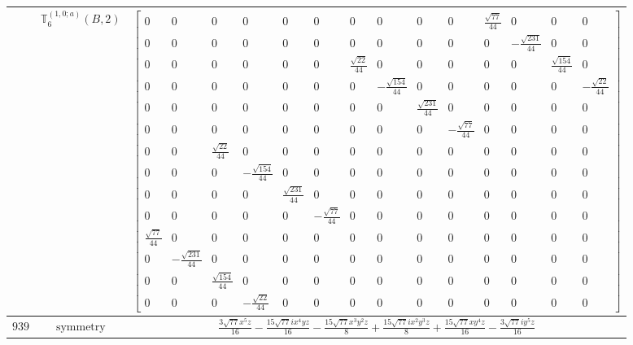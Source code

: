 \documentclass[fleqn,8pt,landscape]{jsarticle}
\begin{document}
\begin{longtable}{ccc}
$  $ & $ \mathbb{T}_{6}^{(1,0;a)}(B,2) $ & $ \begin{bmatrix} 0 & 0 & 0 & 0 & 0 & 0 & 0 & 0 & 0 & 0 & \frac{\sqrt{77}}{44} & 0 & 0 & 0 \\ 0 & 0 & 0 & 0 & 0 & 0 & 0 & 0 & 0 & 0 & 0 & - \frac{\sqrt{231}}{44} & 0 & 0 \\ 0 & 0 & 0 & 0 & 0 & 0 & \frac{\sqrt{22}}{44} & 0 & 0 & 0 & 0 & 0 & \frac{\sqrt{154}}{44} & 0 \\ 0 & 0 & 0 & 0 & 0 & 0 & 0 & - \frac{\sqrt{154}}{44} & 0 & 0 & 0 & 0 & 0 & - \frac{\sqrt{22}}{44} \\ 0 & 0 & 0 & 0 & 0 & 0 & 0 & 0 & \frac{\sqrt{231}}{44} & 0 & 0 & 0 & 0 & 0 \\ 0 & 0 & 0 & 0 & 0 & 0 & 0 & 0 & 0 & - \frac{\sqrt{77}}{44} & 0 & 0 & 0 & 0 \\ 0 & 0 & \frac{\sqrt{22}}{44} & 0 & 0 & 0 & 0 & 0 & 0 & 0 & 0 & 0 & 0 & 0 \\ 0 & 0 & 0 & - \frac{\sqrt{154}}{44} & 0 & 0 & 0 & 0 & 0 & 0 & 0 & 0 & 0 & 0 \\ 0 & 0 & 0 & 0 & \frac{\sqrt{231}}{44} & 0 & 0 & 0 & 0 & 0 & 0 & 0 & 0 & 0 \\ 0 & 0 & 0 & 0 & 0 & - \frac{\sqrt{77}}{44} & 0 & 0 & 0 & 0 & 0 & 0 & 0 & 0 \\ \frac{\sqrt{77}}{44} & 0 & 0 & 0 & 0 & 0 & 0 & 0 & 0 & 0 & 0 & 0 & 0 & 0 \\ 0 & - \frac{\sqrt{231}}{44} & 0 & 0 & 0 & 0 & 0 & 0 & 0 & 0 & 0 & 0 & 0 & 0 \\ 0 & 0 & \frac{\sqrt{154}}{44} & 0 & 0 & 0 & 0 & 0 & 0 & 0 & 0 & 0 & 0 & 0 \\ 0 & 0 & 0 & - \frac{\sqrt{22}}{44} & 0 & 0 & 0 & 0 & 0 & 0 & 0 & 0 & 0 & 0 \end{bmatrix} $ \\ \hline
$ 939 $ & $ \text{symmetry} $ & $ \frac{3 \sqrt{77} x^{5} z}{16} - \frac{15 \sqrt{77} i x^{4} y z}{16} - \frac{15 \sqrt{77} x^{3} y^{2} z}{8} + \frac{15 \sqrt{77} i x^{2} y^{3} z}{8} + \frac{15 \sqrt{77} x y^{4} z}{16} - \frac{3 \sqrt{77} i y^{5} z}{16} $ \\

\end{longtable}
\end{document}
